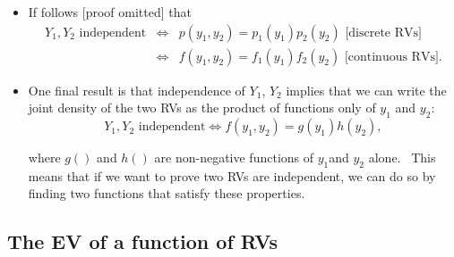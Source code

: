 \documentclass[11pt]{article}
\begin{document}
\begin{itemize}
\item If follows [proof omitted] that 
\begin{eqnarray*}
Y_{1},Y_{2}\text{ independent} &\Leftrightarrow
&p(y_{1},y_{2})=p_{1}(y_{1})p_{2}(y_{2})\text{ [discrete RVs]} \\
&\Leftrightarrow &f(y_{1},y_{2})=f_{1}(y_{1})f_{2}(y_{2})\text{ [continuous
RVs].}
\end{eqnarray*}

\item One final result is that independence of $Y_{1}$, $Y_{2}$ implies that
we can write the joint density of the two RVs as the product of functions
only of $y_{1}$ and $y_{2}$:%
\begin{equation*}
Y_{1},Y_{2}\text{ independent}\Leftrightarrow
f(y_{1},y_{2})=g(y_{1})h(y_{2}),
\end{equation*}

where $g()$ and $h()$ are non-negative functions of $y_{1}$and $y_{2}$
alone. \ This means that if we want to prove two RVs are independent, we can
do so by finding two functions that satisfy these properties.
\end{itemize}

\subsection{The EV of a function of RVs}
\end{document}
